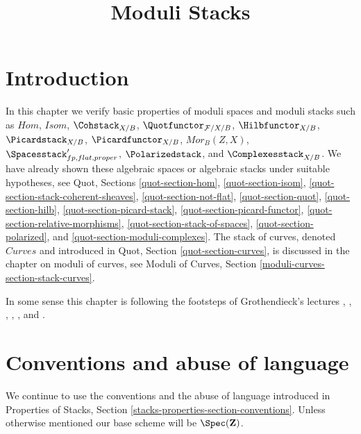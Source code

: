 

%


\title{Moduli Stacks}

\maketitle

\label{section-phantom}

\tableofcontents




\section{Introduction}
\label{section-introduction}

\noindent
In this chapter we verify basic properties of moduli spaces
and moduli stacks such as
$\mathit{Hom}$, $\mathit{Isom}$, $\Cohstack_{X/B}$,
$\Quotfunctor_{\mathcal{F}/X/B}$, $\Hilbfunctor_{X/B}$,
$\Picardstack_{X/B}$, $\Picardfunctor_{X/B}$, $\mathit{Mor}_B(Z, X)$,
$\Spacesstack'_{fp, flat, proper}$, $\Polarizedstack$, and
$\Complexesstack_{X/B}$.
We have already shown these algebraic spaces or algebraic stacks
under suitable hypotheses, see Quot, Sections
\ref{quot-section-hom},
\ref{quot-section-isom},
\ref{quot-section-stack-coherent-sheaves},
\ref{quot-section-not-flat},
\ref{quot-section-quot},
\ref{quot-section-hilb},
\ref{quot-section-picard-stack},
\ref{quot-section-picard-functor},
\ref{quot-section-relative-morphisms},
\ref{quot-section-stack-of-spaces},
\ref{quot-section-polarized}, and
\ref{quot-section-moduli-complexes}.
The stack of curves, denoted $\textit{Curves}$ and introduced
in Quot, Section \ref{quot-section-curves}, is discussed in the
chapter on moduli of curves, see
Moduli of Curves, Section \ref{moduli-curves-section-stack-curves}.

\medskip\noindent
In some sense this chapter is following the footsteps of
Grothendieck's lectures \cite{Gr-I},
\cite{Gr-II},
\cite{Gr-III},
\cite{Gr-IV},
\cite{Gr-V}, and
\cite{Gr-VI}.







\section{Conventions and abuse of language}
\label{section-conventions}

\noindent
We continue to use the conventions and the abuse of language
introduced in
Properties of Stacks, Section \ref{stacks-properties-section-conventions}.
Unless otherwise mentioned our base scheme will be $\Spec(\mathbf{Z})$.






